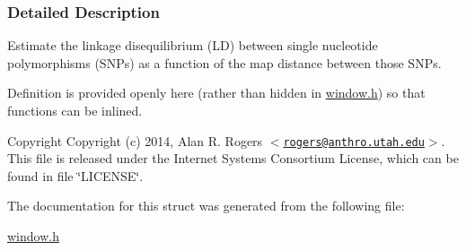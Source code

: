 \subsubsection{\-Detailed \-Description}
\-Estimate the linkage disequilibrium (\-L\-D) between single nucleotide polymorphisms (\-S\-N\-Ps) as a function of the map distance between those \-S\-N\-Ps. 

\-Definition is provided openly here (rather than hidden in \hyperlink{window_8h}{window.\-h}) so that functions can be inlined.

\begin{DoxyCopyright}{\-Copyright}
\-Copyright (c) 2014, \-Alan \-R. \-Rogers $<$\href{mailto:rogers@anthro.utah.edu}{\tt rogers@anthro.\-utah.\-edu}$>$. \-This file is released under the \-Internet \-Systems \-Consortium \-License, which can be found in file \char`\"{}\-L\-I\-C\-E\-N\-S\-E\char`\"{}. 
\end{DoxyCopyright}


\-The documentation for this struct was generated from the following file\-:\begin{DoxyCompactItemize}
\item 
\hyperlink{window_8h}{window.\-h}\end{DoxyCompactItemize}

